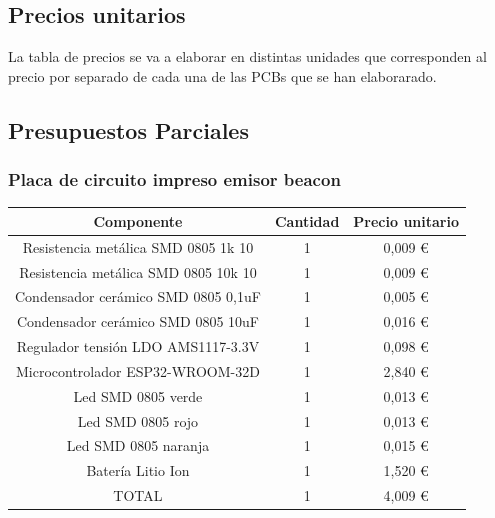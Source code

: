 \documentclass[a4paper ,12pt, onecolumn]{article}
\begin{document}
    \subsection{Precios unitarios}
        La tabla de precios se va a elaborar en distintas unidades que corresponden al precio por separado de cada
        una de las PCBs que se han elaborarado.
    \subsection{Presupuestos Parciales}
            \subsubsection{Placa de circuito impreso emisor beacon}
                \begin{center}
                    \begin{tabular}{||c | c |c ||} 
                    \hline
                    Componente & Cantidad & Precio unitario  \\ [0.5ex] 
                    \hline
                    Resistencia metálica SMD 0805 1k 10  	&1&	 0,009 € \\ 
                    Resistencia metálica SMD 0805 10k 10 	&1&	 0,009 € \\ 
                    Condensador cerámico SMD 0805 0,1uF  	&1&	 0,005 € \\ 
                    Condensador cerámico SMD 0805 10uF   	&1&	 0,016 € \\ 
                    Regulador tensión LDO AMS1117-3.3V   	&1&	 0,098 € \\ 
                    Microcontrolador ESP32-WROOM-32D     	&1&	 2,840 € \\ 
                    Led SMD 0805 verde                   	&1&	 0,013 € \\ 
                    Led SMD 0805 rojo                    	&1&	 0,013 € \\ 
                    Led SMD 0805 naranja                 	&1&	 0,015 € \\ 
                    Batería Litio Ion                    	&1&	 1,520 € \\ 
                    \hline
                    TOTAL                    	            &1&	 4,009 € \\ 

                \hline
                    \end{tabular}
                \end{center}
\end{document}
